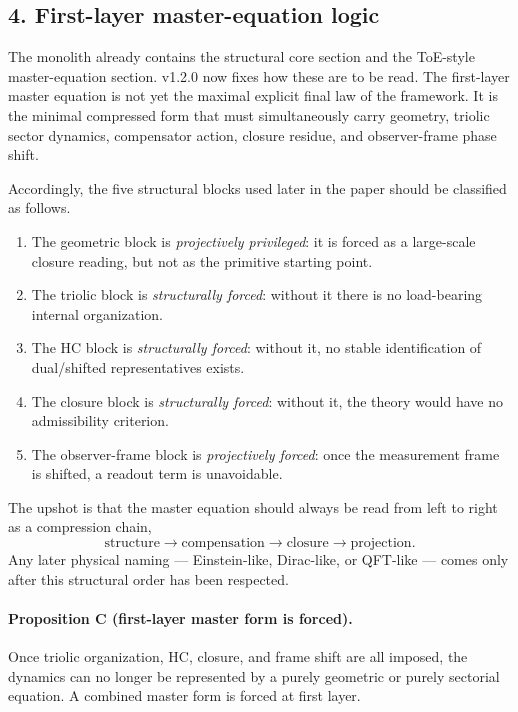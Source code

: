 \subsection*{4. First-layer master-equation logic}
The monolith already contains the structural core section and the ToE-style
master-equation section. v1.2.0 now fixes how these are to be read.
The first-layer master equation is not yet the maximal explicit final law of
the framework. It is the minimal compressed form that must simultaneously carry
geometry, triolic sector dynamics, compensator action, closure residue, and
observer-frame phase shift.

Accordingly, the five structural blocks used later in the paper should be
classified as follows.
\begin{enumerate}[leftmargin=2em]
  \item The geometric block is \emph{projectively privileged}: it is forced as a
  large-scale closure reading, but not as the primitive starting point.
  \item The triolic block is \emph{structurally forced}: without it there is no
  load-bearing internal organization.
  \item The HC block is \emph{structurally forced}: without it, no stable
  identification of dual/shifted representatives exists.
  \item The closure block is \emph{structurally forced}: without it, the theory
  would have no admissibility criterion.
  \item The observer-frame block is \emph{projectively forced}: once the
  measurement frame is shifted, a readout term is unavoidable.
\end{enumerate}

The upshot is that the master equation should always be read from left to right
as a compression chain,
\[
\text{structure} \to \text{compensation} \to \text{closure} \to \text{projection}.
\]
Any later physical naming --- Einstein-like, Dirac-like, or QFT-like --- comes
only after this structural order has been respected.

\paragraph{Proposition C (first-layer master form is forced).}
Once triolic organization, HC, closure, and frame shift are all imposed, the
dynamics can no longer be represented by a purely geometric or purely sectorial
equation. A combined master form is forced at first layer.

